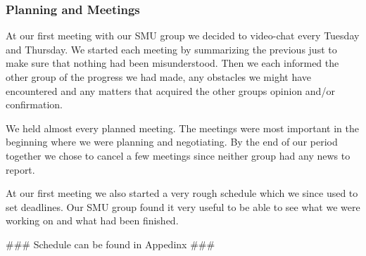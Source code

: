 \subsubsection{Planning and Meetings}
At our first meeting with our SMU group we decided to video-chat every Tuesday and Thursday. We started each meeting by summarizing the previous just to make sure that nothing had been misunderstood. Then we each informed the other group of the progress we had made, any obstacles we might have encountered and any matters that acquired the other groups opinion and/or confirmation. 

We held almost every planned meeting. The meetings were most important in the beginning where we were planning and negotiating. By the end of our period together we chose to cancel a few meetings since neither group had any news to report.

At our first meeting we also started a very rough schedule which we since used to set deadlines. Our SMU group found it very useful to be able to see what we were working on and what had been finished.

\#\#\# Schedule can be found in Appedinx \#\#\#